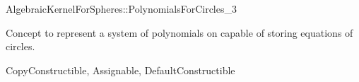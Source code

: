 \begin{ccRefConcept}{AlgebraicKernelForSpheres::PolynomialsForCircles_3}

\ccDefinition

Concept to represent a system of polynomials on 
capable of storing equations of circles. 

\ccRefines
CopyConstructible, Assignable, DefaultConstructible






\ccHasModels


\ccSeeAlso


\end{ccRefConcept}
